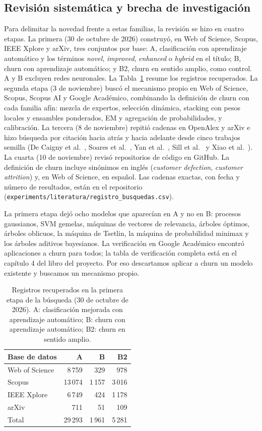 \documentclass[11pt,a4paper]{article}
\begin{document}
\subsection{Revisión sistemática y brecha de investigación}\label{sec:novedad}
Para delimitar la novedad frente a estas familias, la revisión se hizo en cuatro etapas. La primera (30 de octubre de 2026) construyó, en Web of Science, Scopus, IEEE Xplore y arXiv, tres conjuntos por base: A, clasificación con aprendizaje automático y los términos \emph{novel}, \emph{improved}, \emph{enhanced} o \emph{hybrid} en el título; B, churn con aprendizaje automático; y B2, churn en sentido amplio, como control. A y B excluyen redes neuronales. La Tabla~\ref{tab:busqueda} resume los registros recuperados. La segunda etapa (3 de noviembre) buscó el mecanismo propio en Web of Science, Scopus, Scopus AI y Google Académico, combinando la definición de churn con cada familia afín: mezcla de expertos, selección dinámica, stacking con pesos locales y ensambles ponderados, EM y agregación de probabilidades, y calibración. La tercera (8 de noviembre) repitió cadenas en OpenAlex y arXiv e hizo búsqueda por citación hacia atrás y hacia adelante desde cinco trabajos semilla (De Caigny et al.\ \cite{decaigny2018}, Soares et al.\ \cite{soares2006}, Yan et al.\ \cite{yan2001}, Sill et al.\ \cite{sill2009} y Xiao et al.\ \cite{xiao2012}). La cuarta (10 de noviembre) revisó repositorios de código en GitHub. La definición de churn incluye sinónimos en inglés (\emph{customer defection}, \emph{customer attrition}) y, en Web of Science, en español. Las cadenas exactas, con fecha y número de resultados, están en el repositorio (\texttt{experiments/literatura/registro\_busquedas.csv}).

La primera etapa dejó ocho modelos que aparecían en A y no en B: procesos gaussianos, SVM gemelas, máquinas de vectores de relevancia, árboles óptimos, árboles oblicuos, la máquina de Tsetlin, la máquina de probabilidad minimax y los árboles aditivos bayesianos. La verificación en Google Académico encontró aplicaciones a churn para todos; la tabla de verificación completa está en el capítulo 4 del libro del proyecto. Por eso descartamos aplicar a churn un modelo existente y buscamos un mecanismo propio.

\begin{table}[t]
\centering
\caption{Registros recuperados en la primera etapa de la búsqueda (30 de octubre de 2026). A: clasificación mejorada con aprendizaje automático; B: churn con aprendizaje automático; B2: churn en sentido amplio.}
\label{tab:busqueda}
\small
\begin{tabular}{lrrr}
\toprule
Base de datos & A & B & B2 \\
\midrule
Web of Science & 8\,759 & 329 & 978 \\
Scopus & 13\,074 & 1\,157 & 3\,016 \\
IEEE Xplore & 6\,749 & 424 & 1\,178 \\
arXiv & 711 & 51 & 109 \\
\midrule
Total & 29\,293 & 1\,961 & 5\,281 \\
\bottomrule
\end{tabular}
\end{table}
\end{document}
